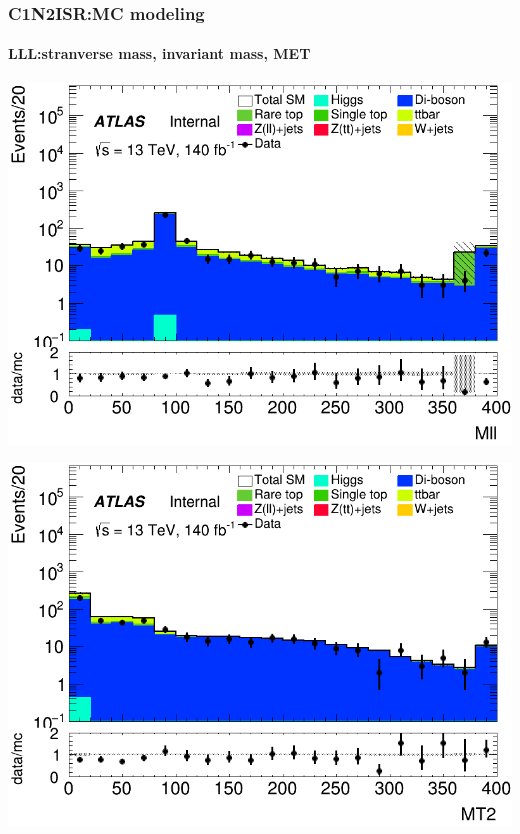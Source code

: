 \documentclass[usenames,dvipsnames]{beamer}
\begin{document}
\begin{frame}
\frametitle{C1N2ISR:MC modeling}
\framesubtitle{LLL:\quad stranverse mass, invariant mass, MET}
    \begin{minipage}{0.32\textwidth}
        \centering
        \includegraphics[width=\textwidth]{graphics/LLL_met/LLL_met_Mll.png}
    \end{minipage}
    \hfill
    \begin{minipage}{0.32\textwidth}
        \centering
        \includegraphics[width=\textwidth]{graphics/LLL_met/LLL_met_MT2.png}
    \end{minipage}
    \hfill
    

\end{frame}
\end{document}
